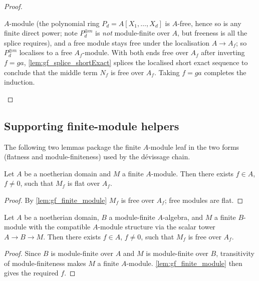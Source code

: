 \begin{proof}
\begin{enumerate}
      \(A\)-module (the polynomial ring \(P_d = A[X_1, \dots, X_d]\) is \(A\)-free, hence
      so is any finite direct power; note \(P_d^{\oplus m}\) is \emph{not} module-finite
      over \(A\), but freeness is all the splice requires), and a free module stays free
      under the localisation \(A \to A_f\); so \(P_d^{\oplus m}\) localises to a free
      \(A_f\)-module. With both ends free over \(A_f\) after inverting \(f = g a\),
      \cref{lem:gf_splice_shortExact} splices the localised short exact sequence to
      conclude that the middle term \(N_f\) is free over \(A_f\). Taking \(f = g a\)
      completes the induction.
  \end{enumerate}
\end{proof}

\subsection{Supporting finite-module helpers}
\label{sec:gf_finite_helpers}

The following two lemmas package the finite \(A\)-module leaf in the two forms
(flatness and module-finiteness) used by the dévissage chain.

\begin{lemma}



  \label{lem:gf_flat_finite}
  Let \(A\) be a noetherian domain and \(M\) a finite \(A\)-module. Then there exists
  \(f \in A\), \(f \ne 0\), such that \(M_f\) is flat over \(A_f\).
\end{lemma}
\begin{proof}
  \leanok
  By \cref{lem:gf_finite_module} \(M_f\) is free over \(A_f\); free modules are flat.
\end{proof}

\begin{lemma}



  \label{lem:gf_free_moduleFinite}
  Let \(A\) be a noetherian domain, \(B\) a module-finite \(A\)-algebra, and \(M\) a
  finite \(B\)-module with the compatible \(A\)-module structure via the scalar tower
  \(A \to B \to M\). Then there exists \(f \in A\), \(f \ne 0\), such that \(M_f\)
  is free over \(A_f\).
\end{lemma}
\begin{proof}
  \leanok
  Since \(B\) is module-finite over \(A\) and \(M\) is module-finite over \(B\),
  transitivity of module-finiteness makes \(M\) a finite \(A\)-module.
  \cref{lem:gf_finite_module} then gives the required \(f\).
\end{proof}

